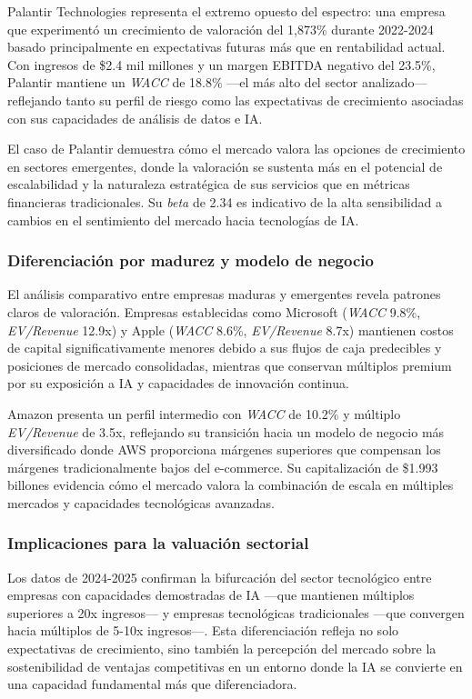 Palantir Technologies representa el extremo opuesto del espectro: una empresa que experimentó un crecimiento de valoración del 1,873\% durante 2022-2024 basado principalmente en expectativas futuras más que en rentabilidad actual. Con ingresos de \$2.4 mil millones y un margen EBITDA negativo del 23.5\%, Palantir mantiene un \emph{WACC} de 18.8\% ---el más alto del sector analizado--- reflejando tanto su perfil de riesgo como las expectativas de crecimiento asociadas con sus capacidades de análisis de datos e IA.

El caso de Palantir demuestra cómo el mercado valora las opciones de crecimiento en sectores emergentes, donde la valoración se sustenta más en el potencial de escalabilidad y la naturaleza estratégica de sus servicios que en métricas financieras tradicionales. Su \emph{beta} de 2.34 es indicativo de la alta sensibilidad a cambios en el sentimiento del mercado hacia tecnologías de IA.

\subsubsection{Diferenciación por madurez y modelo de negocio}

El análisis comparativo entre empresas maduras y emergentes revela patrones claros de valoración. Empresas establecidas como Microsoft (\emph{WACC} 9.8\%, \emph{EV/Revenue} 12.9x) y Apple (\emph{WACC} 8.6\%, \emph{EV/Revenue} 8.7x) mantienen costos de capital significativamente menores debido a sus flujos de caja predecibles y posiciones de mercado consolidadas, mientras que conservan múltiplos premium por su exposición a IA y capacidades de innovación continua.

Amazon presenta un perfil intermedio con \emph{WACC} de 10.2\% y múltiplo \emph{EV/Revenue} de 3.5x, reflejando su transición hacia un modelo de negocio más diversificado donde AWS proporciona márgenes superiores que compensan los márgenes tradicionalmente bajos del e-commerce. Su capitalización de \$1.993 billones evidencia cómo el mercado valora la combinación de escala en múltiples mercados y capacidades tecnológicas avanzadas.

\subsubsection{Implicaciones para la valuación sectorial}

Los datos de 2024-2025 confirman la bifurcación del sector tecnológico entre empresas con capacidades demostradas de IA ---que mantienen múltiplos superiores a 20x ingresos--- y empresas tecnológicas tradicionales ---que convergen hacia múltiplos de 5-10x ingresos---. Esta diferenciación refleja no solo expectativas de crecimiento, sino también la percepción del mercado sobre la sostenibilidad de ventajas competitivas en un entorno donde la IA se convierte en una capacidad fundamental más que diferenciadora.

